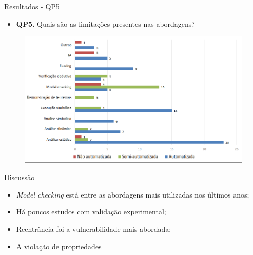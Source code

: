 \begin{frame}{Resultados - QP5}
    \begin{itemize}
        \item \textbf{QP5.} Quais são as limitações presentes nas abordagens?
    \end{itemize}
    \begin{figure}[!htb]
     \centering
     \includegraphics[scale=0.4]{figuras/metodologia/rq5-automacao.png}
    \end{figure}     
\end{frame}

\begin{frame}{Discussão}
    \begin{itemize}
        \item \textit{Model checking} está entre as abordagens mais utilizadas nos últimos anos;
        \item Há poucos estudos com validação experimental;
        \item Reentrância foi a vulnerabilidade mais abordada;
        \item A violação de propriedades 
    \end{itemize}
\end{frame}

